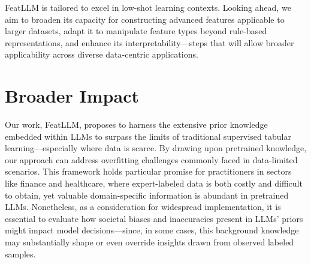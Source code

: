 \textsf{FeatLLM} is tailored to excel in low-shot learning contexts. Looking ahead, we aim to broaden its capacity for constructing advanced features applicable to larger datasets, adapt it to manipulate feature types beyond rule-based representations, and enhance its interpretability—steps that will allow broader applicability across diverse data-centric applications.

\section{Broader Impact}
Our work, \textsf{FeatLLM}, proposes to harness the extensive prior knowledge embedded within LLMs to surpass the limits of traditional supervised tabular learning—especially where data is scarce. By drawing upon pretrained knowledge, our approach can address overfitting challenges commonly faced in data-limited scenarios. This framework holds particular promise for practitioners in sectors like finance and healthcare, where expert-labeled data is both costly and difficult to obtain, yet valuable domain-specific information is abundant in pretrained LLMs. Nonetheless, as a consideration for widespread implementation, it is essential to evaluate how societal biases and inaccuracies present in LLMs’ priors might impact model decisions—since, in some cases, this background knowledge may substantially shape or even override insights drawn from observed labeled samples.

